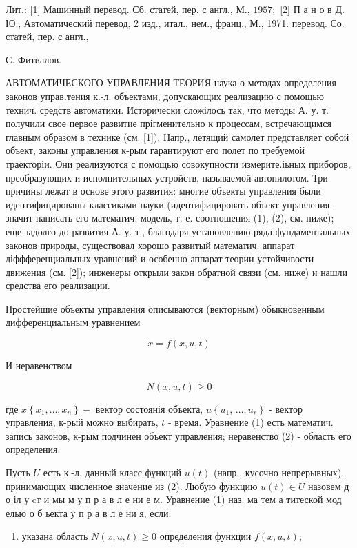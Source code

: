 \documentclass[10pt]{article}
\begin{document}
Лит.: [1] Машинный перевод. Сб. статей, пер. с англ., М., $1957 ;$ [2] П а н о в Д. Ю., Автоматический перевод, 2 изд., итал., нем., франц., М., 1971. перевод. Со. статей, пер. с англ.,

С. Фитиалов.



АВТОМАТИЧЕСКОГО УПРАВЛЕНИЯ ТЕОРИЯ наука о методах определения законов управ.тения к.-л. объектами, допускающих реализацию с помощью технич. средств автоматики. Исторически сложілось так, что методы А. у. т. получили свое первое развитие прігменительно к процессам, встречающимся главным образом в технике (см. [1]). Напр., летящий самолет представляет собой объект, законы управления к-рым гарантируют его полет по требуемой траекторіи. Они реализуются с помощью совокупности измерите.іьных приборов, преобразующих и исполнительных устройств, называемой автопилотом. Три причины лежат в основе этого развития: многие объекты управления были идентифицированы классиками науки (идентифицировать объект управления - значит написать его математич. модель, т. е. соотношения (1), (2), см. ниже); еще задолго до развития А. у. т., благодаря установлению ряда фундаментальных законов природы, существовал хорошо развитый математич. аппарат діффференциальных уравнений и особенно аппарат теории устойчивости движения (см. [2]); инженеры открыли закон обратной связи (см. ниже) и нашли средства его реализации.



Простейшие объекты управления описываются (векторным) обыкновенным дифференциальным уравнением



\[

\dot{x}=f(x, u, t)

\]



И неравенством



\[

N(x, u, t) \geqslant 0

\]



где $x\left\{x_{1}, \ldots, x_{n}\right\}-$ вектор состоянія объекта, $u\left\{u_{1}\right.$, $\left.\ldots, u_{r}\right\}$ - вектор управления, к-рый можно выбирать, $t$ - время. Уравнение (1) есть математич. запись законов, к-рым подчинен объект управления; неравенство (2) - область его определения.



Пусть $U$ есть к.-л. данный класс функций $u(t)$ (напр., кусочно непрерывных), принимающих численное значение из (2). Любую функцию $u(t) \in U$ назовем д о іл у cт и мы м у п р а в л е ни е м. Уравнение (1) наз. ма тем а титеской мод елью о б ьекта у п р а в л е ни я, если:



\begin{enumerate}

  \item указана область $N(x, u, t) \geqslant 0$ определения функции $f(x, u, t)$;

\end{enumerate}
\end{document}
